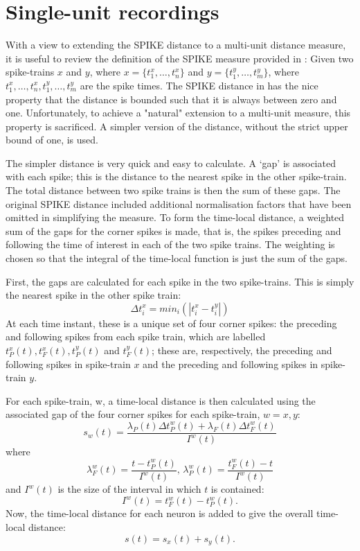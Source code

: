 \section{Single-unit recordings}
With a view to extending the SPIKE distance to a multi-unit distance measure, it is useful to review the definition of the SPIKE measure provided in \cite{KreuzEtAl2011a}:  Given two spike-trains $x$ and $y$, where $x = \{ t_1^x, \ldots, t_n^x \}$ and $y = \{ t_1^y, \ldots , t_m^y\}$, where $t_1^x,\ldots,t_n^x,t_1^y,\ldots,t_m^y$ are the spike times.  The SPIKE distance in \cite{KreuzEtAl2011a} has the nice property that the distance is bounded such that it is always between zero and one.  Unfortunately, to achieve a "natural" extension to a multi-unit measure, this property is sacrificed.  A simpler version of the distance, without the strict upper bound of one, is used.

The simpler distance is very quick and easy to calculate.  A `gap' is associated with each spike; this is the distance to the nearest spike in the other spike-train.  The total distance between two spike trains is then the sum of these gaps.  The original SPIKE distance included additional normalisation factors that have been omitted in simplifying the measure.  To form the time-local distance, a weighted sum of the gaps for the corner spikes is made, that is, the spikes preceding and following the time of interest in each of the two spike trains.  The weighting is chosen so that the integral of the time-local function is just the sum of the gaps.

First, the gaps are calculated for each spike in the two spike-trains.  This is simply the nearest spike in the other spike train:
\begin{equation}
\Delta t_i^x = min_i ( | t_i^x - t_i^y |)
\end{equation}
At each time instant, these is a unique set of four corner spikes: the preceding and following spikes from each spike train, which are labelled $t_P^x(t), t_F^x(t), t_P^y(t)$ and  $t_F^y(t)$; these are, respectively, the preceding and following spikes in spike-train $x$ and the preceding and following spikes in spike-train $y$.

For each spike-train, w, a time-local distance is then calculated using the associated gap of the four corner spikes for each spike-train, $w=x,y$:
\begin{equation}
s_w(t) = \frac{\lambda_P(t) \Delta t_P^w(t) + \lambda_F(t)\Delta t_F^w(t)}{I^w(t)}
\end{equation}
where
\begin{equation}
\lambda_F^w(t) = \frac{t- t_P^w(t)}{I^w(t)}, \, \lambda_P^w(t) = \frac{ t_F^w(t) - t}{I^w(t)}
\end{equation}
and $I^w(t)$ is the size of the interval in which $t$ is contained:
\begin{equation}
I^w(t) = t_F^w(t) - t_P^w(t).
\end{equation}
Now, the time-local distance for each neuron is added to give the overall time-local distance:
\begin{equation}
s(t) = s_x(t) + s_y(t).
\end{equation}

